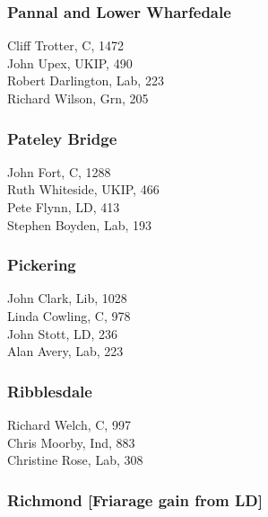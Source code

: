 \documentclass[a4paper,openany,10pt]{book}
\begin{document}
\subsubsection*{Pannal and Lower Wharfedale}



Cliff Trotter, C, 1472\\
John Upex, UKIP, 490\\
Robert Darlington, Lab, 223\\
Richard Wilson, Grn, 205\\


\subsubsection*{Pateley Bridge}



John Fort, C, 1288\\
Ruth Whiteside, UKIP, 466\\
Pete Flynn, LD, 413\\
Stephen Boyden, Lab, 193\\


\subsubsection*{Pickering}



John Clark, Lib, 1028\\
Linda Cowling, C, 978\\
John Stott, LD, 236\\
Alan Avery, Lab, 223\\


\subsubsection*{Ribblesdale}



Richard Welch, C, 997\\
Chris Moorby, Ind, 883\\
Christine Rose, Lab, 308\\


\subsubsection*{Richmond \hspace*{\fill}\nolinebreak[1]%
\enspace\hspace*{\fill}
[Friarage gain from LD]}
\end{document}
